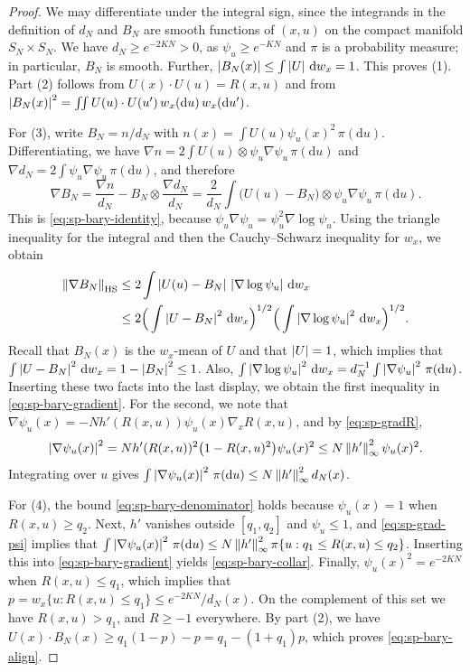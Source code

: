 \begin{proof}
We may differentiate under the integral sign, since the integrands in the definition of $d_N$ and $B_N$ are smooth functions of $(x,u)$ on the compact manifold $S_N\times S_N$. We have $d_N\ge e^{-2KN}>0$, as $\psi_u\ge e^{-KN}$ and $\pi$ is a probability measure; in particular, $B_N$ is smooth. Further, $\left|B_N(x)\right|\le\int\left|U\right|\,\mathrm d w_x=1$. This proves (1). Part (2) follows from $U(x)\cdot U(u)=R(x,u)$ and from $\left|B_N(x)\right|^2=\iint U(u)\cdot U(u')\,w_x(\mathrm du)\,w_x(\mathrm du')$.

For (3), write $B_N=n/d_N$ with $n(x)=\int U(u)\psi_u(x)^2\,\pi(\mathrm du)$. Differentiating, we have $\nabla n=2\int U(u)\otimes\psi_u\nabla\psi_u\,\pi(\mathrm du)$ and $\nabla d_N=2\int\psi_u\nabla\psi_u\,\pi(\mathrm du)$, and therefore
\[
\nabla B_N=\frac{\nabla n}{d_N}-B_N\otimes\frac{\nabla d_N}{d_N}=\frac2{d_N}\int\big(U(u)-B_N\big)\otimes\psi_u\nabla\psi_u\,\pi(\mathrm du).
\]
This is \eqref{eq:sp-bary-identity}, because $\psi_u\nabla\psi_u=\psi_u^2\nabla\log\psi_u$. Using the triangle inequality for the integral and then the Cauchy--Schwarz inequality for $w_x$, we obtain
\begin{align*}
\left\lVert\nabla B_N\right\rVert_{\rm HS}&\le2\int\left|U(u)-B_N\right|\,\left|\nabla\log\psi_u\right|\,\mathrm dw_x\\
&\le2\Big(\int\left|U-B_N\right|^2\,\mathrm d w_x\Big)^{1/2}\Big(\int\left|\nabla\log\psi_u\right|^2\,\mathrm d w_x\Big)^{1/2}.
\end{align*}
Recall that $B_N(x)$ is the $w_x$-mean of $U$ and that $\left|U\right|=1$, which implies that $\int\left|U-B_N\right|^2\,\mathrm d w_x=1-\left|B_N\right|^2\le1$. Also, $\int\left|\nabla\log\psi_u\right|^2\,\mathrm d w_x=d_N^{-1}\int\left|\nabla\psi_u\right|^2\,\pi(\mathrm du)$. Inserting these two facts into the last display, we obtain the first inequality in \eqref{eq:sp-bary-gradient}. For the second, we note that $\nabla\psi_u(x)=-Nh'(R(x,u))\psi_u(x)\nabla_xR(x,u)$, and by \eqref{eq:sp-gradR},
\begin{equation}\label{eq:sp-grad-psi}
\left|\nabla\psi_u(x)\right|^2=Nh'(R(x,u))^2\big(1-R(x,u)^2\big)\psi_u(x)^2\le N\left\lVert h'\right\rVert_\infty^2\psi_u(x)^2.
\end{equation}
Integrating over $u$ gives $\int\left|\nabla\psi_u(x)\right|^2\,\pi(\mathrm du)\le N\left\lVert h'\right\rVert_\infty^2d_N(x)$.

For (4), the bound \eqref{eq:sp-bary-denominator} holds because $\psi_u(x)=1$ when $R(x,u)\ge q_2$. Next, $h'$ vanishes outside $[q_1,q_2]$ and $\psi_u\le1$, and \eqref{eq:sp-grad-psi} implies that $\int\left|\nabla\psi_u(x)\right|^2\,\pi(\mathrm du)\le N\left\lVert h'\right\rVert_\infty^2\pi\{u:q_1\le R(x,u)\le q_2\}$. Inserting this into \eqref{eq:sp-bary-gradient} yields \eqref{eq:sp-bary-collar}. Finally, $\psi_u(x)^2=e^{-2KN}$ when $R(x,u)\le q_1$, which implies that $p=w_x\{u:R(x,u)\le q_1\}\le e^{-2KN}/d_N(x)$. On the complement of this set we have $R(x,u)>q_1$, and $R\ge-1$ everywhere. By part (2), we have $U(x)\cdot B_N(x)\ge q_1(1-p)-p=q_1-(1+q_1)p$, which proves \eqref{eq:sp-bary-align}.
\end{proof}

